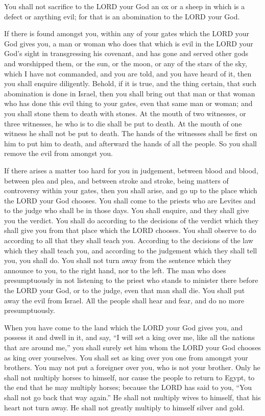  You shall not sacrifice to the LORD your God an ox or a
sheep in which is a defect or anything evil; for that is an abomination
to the LORD your God.

 If there is found amongst you, within any of your gates
which the LORD your God gives you, a man or woman who does that which is
evil in the LORD your God's sight in transgressing his covenant,
 and has gone and served other gods and worshipped them,
or the sun, or the moon, or any of the stars of the sky, which I have
not commanded,  and you are told, and you have heard of
it, then you shall enquire diligently. Behold, if it is true, and the
thing certain, that such abomination is done in Israel, 
then you shall bring out that man or that woman who has done this evil
thing to your gates, even that same man or woman; and you shall stone
them to death with stones.  At the mouth of two witnesses,
or three witnesses, he who is to die shall be put to death. At the mouth
of one witness he shall not be put to death.  The hands of
the witnesses shall be first on him to put him to death, and afterward
the hands of all the people. So you shall remove the evil from amongst
you.

 If there arises a matter too hard for you in judgement,
between blood and blood, between plea and plea, and between stroke and
stroke, being matters of controversy within your gates, then you shall
arise, and go up to the place which the LORD your God chooses.
 You shall come to the priests who are Levites and to the
judge who shall be in those days. You shall enquire, and they shall give
you the verdict.  You shall do according to the decisions
of the verdict which they shall give you from that place which the LORD
chooses. You shall observe to do according to all that they shall teach
you.  According to the decisions of the law which they
shall teach you, and according to the judgement which they shall tell
you, you shall do. You shall not turn away from the sentence which they
announce to you, to the right hand, nor to the left.  The
man who does presumptuously in not listening to the priest who stands to
minister there before the LORD your God, or to the judge, even that man
shall die. You shall put away the evil from Israel.  All
the people shall hear and fear, and do no more presumptuously.

 When you have come to the land which the LORD your God
gives you, and possess it and dwell in it, and say, ``I will set a king
over me, like all the nations that are around me,''  you
shall surely set him whom the LORD your God chooses as king over
yourselves. You shall set as king over you one from amongst your
brothers. You may not put a foreigner over you, who is not your brother.
 Only he shall not multiply horses to himself, nor cause
the people to return to Egypt, to the end that he may multiply horses;
because the LORD has said to you, ``You shall not go back that way
again.''  He shall not multiply wives to himself, that
his heart not turn away. He shall not greatly multiply to himself silver
and gold.

